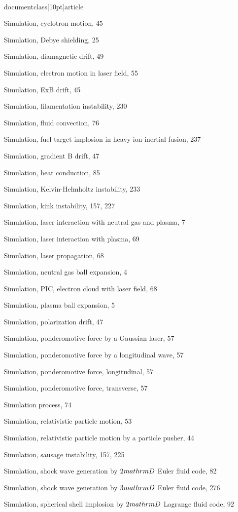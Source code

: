 \\documentclass[10pt]{article}
\begin{document}
{{{{{{Simulation, cyclotron motion, 45

Simulation, Debye shielding, 25

Simulation, diamagnetic drift, 49

Simulation, electron motion in laser field, 55

Simulation, ExB drift, 45

Simulation, filamentation instability, 230

Simulation, fluid convection, 76

Simulation, fuel target implosion in heavy ion inertial fusion, 237

Simulation, gradient B drift, 47

Simulation, heat conduction, 85

Simulation, Kelvin-Helmholtz instability, 233

Simulation, kink instability, 157, 227

Simulation, laser interaction with neutral gas and plasma, 7

Simulation, laser interaction with plasma, 69

Simulation, laser propagation, 68

Simulation, neutral gas ball expansion, 4

Simulation, PIC, electron cloud with laser field, 68

Simulation, plasma ball expansion, 5

Simulation, polarization drift, 47

Simulation, ponderomotive force by a Gaussian laser, 57

Simulation, ponderomotive force by a longitudinal wave, 57

Simulation, ponderomotive force, longitudinal, 57

Simulation, ponderomotive force, transverse, 57

Simulation process, 74

Simulation, relativistic particle motion, 53

Simulation, relativistic particle motion by a particle pusher, 44

Simulation, sausage instability, 157, 225

Simulation, shock wave generation by $2 \\mathrm{D}$ Euler fluid code, 82

Simulation, shock wave generation by $3 \\mathrm{D}$ Euler fluid code, 276

Simulation, spherical shell implosion by $2 \\mathrm{D}$ Lagrange fluid code, 92

}}}}}}
\end{document}
